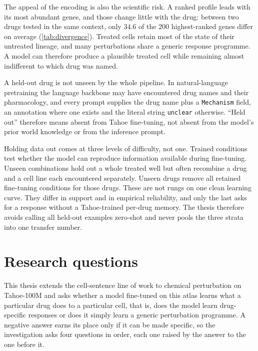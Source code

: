 The appeal of the encoding is also the scientific risk. A ranked profile leads
with its most abundant genes, and those change little with the drug: between
two drugs tested in the same context, only $34.6$ of the $200$ highest-ranked
genes differ on average (\cref{tab:divergence}). Treated cells retain most of
the state of their untreated lineage, and many perturbations share a generic
response programme. A model can therefore produce a plausible treated cell while
remaining almost indifferent to which drug was named.

\begin{scopelimit}
A held-out drug is not unseen by the whole pipeline. In natural-language
pretraining the language backbone may have encountered drug names and their
pharmacology, and every prompt supplies the drug name plus a \texttt{Mechanism}
field, an annotation where one exists and the literal string \texttt{unclear}
otherwise.
``Held out'' therefore means absent from Tahoe fine-tuning, not absent from the
model's prior world knowledge or from the inference prompt.
\end{scopelimit}

Holding data out comes at three levels of difficulty, not one. Trained
conditions test whether the model can reproduce information available during
fine-tuning. Unseen combinations hold out a whole treated well but often
recombine a drug and a cell line each encountered separately. Unseen drugs
remove all retained fine-tuning conditions for those drugs. These are not rungs
on one clean learning curve. They differ in support and in empirical
reliability, and only the last asks for a response without a Tahoe-trained
per-drug memory. The thesis therefore avoids calling all held-out examples
zero-shot and never pools the three strata into one transfer number.

\section{Research questions}
\label{sec:intro-map}

This thesis extends the cell-sentence line of work to chemical perturbation on
Tahoe-100M and asks whether a model fine-tuned on this atlas learns what a
particular drug does to a particular cell, that is, does the model learn drug-specific responses or does it simply learn a generic perturbation programme. A negative answer earns its place
only if it can be made specific, so the investigation asks four questions in
order, each one raised by the answer to the one before it.

